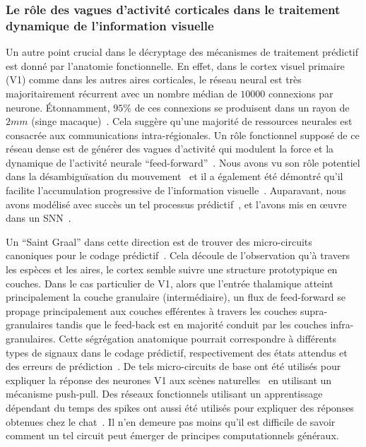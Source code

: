 \subsubsection{Le rôle des vagues d'activité corticales dans le traitement
dynamique de l'information
visuelle}
Un autre point crucial dans le décryptage des mécanismes de traitement
prédictif est donné par l'anatomie fonctionnelle. En effet, dans le
cortex visuel primaire (V1) comme dans les autres aires corticales, le
réseau neural est très majoritairement récurrent avec un nombre médian de $10000$
connexions par neurone. Étonnamment, $95 \%$ de ces connexions se
produisent dans un rayon de $2 mm$ (singe macaque)~\citep{Markov13}.
Cela suggère qu'une majorité de ressources neurales est consacrée aux
communications intra-régionales. Un rôle fonctionnel supposé de ce
réseau dense est de générer des vagues d'activité qui modulent la force
et la dynamique de l'activité neurale ``feed-forward''~\citep{Muller18}. Nous avons vu son rôle potentiel dans la désambiguïsation du
mouvement~\citep{Chemla19} et il a également été démontré qu'il
facilite l'accumulation progressive de l'information visuelle~\citep{Bringuier99}. Auparavant, nous avons modélisé avec succès un tel
processus prédictif~\citep{Perrinet12pred,Khoei13jpp,KhoeiMassonPerrinet17}, et l'avons mis en œuvre dans un SNN~\citep{Kaplan13}.

Un ``Saint Graal'' dans cette direction est de trouver des micro-circuits
canoniques pour le codage prédictif~\citep{Bastos12}. Cela découle
de l'observation qu'à travers les espèces et les aires, le cortex semble
suivre une structure prototypique en couches. Dans le cas particulier de
V1, alors que l'entrée thalamique atteint principalement la couche
granulaire (intermédiaire), un flux de feed-forward se propage
principalement aux couches efférentes à travers les couches
supra-granulaires tandis que le feed-back est en majorité conduit  par les
couches infra-granulaires. Cette ségrégation anatomique pourrait
correspondre à différents types de signaux dans le codage prédictif,
respectivement des états attendus et des erreurs de prédiction~\citep{Bastos12}. De tels micro-circuits de base ont été utilisés pour
expliquer la réponse des neurones V1 aux scènes naturelles~\citep{Kremkow16} en utilisant un mécanisme push-pull. Des réseaux fonctionnels utilisant un apprentissage dépendant du temps des spikes ont aussi été utilisés pour expliquer des réponses obtenues chez le chat~\citep{Ladret19sfn}. Il n'en demeure pas moins
qu'il est difficile de savoir comment un tel circuit peut émerger de principes computationnels généraux.

